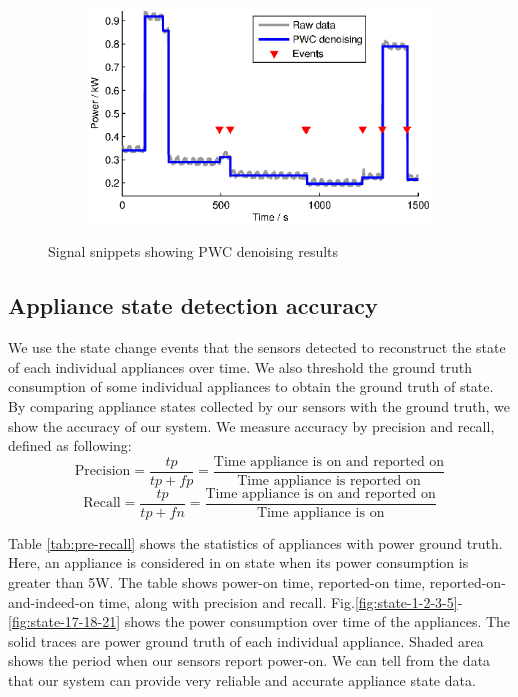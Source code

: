 \begin{figure}[htbp]
\begin{subfigure}[t]{0.47\textwidth}
        \caption{}
    \end{subfigure} 
    \begin{subfigure}[t]{0.47\textwidth}
        \centering
        \includegraphics[width=\textwidth] {../../sw/pc/matlab/pwc-result/4.eps}
        \caption{}
    \end{subfigure} 
    \caption{Signal snippets showing PWC denoising results}\label{fig:pwc-example}
\end{figure}

\subsection{Appliance state detection accuracy}

We use the state change events that the sensors detected to reconstruct the state of each individual appliances over time. We also threshold the ground truth consumption of some individual appliances to obtain the ground truth of state. By comparing appliance states collected by our sensors with the ground truth, we show the accuracy of our system. We measure accuracy by precision and recall, defined as following:
\[
\text{Precision} = \frac{tp}{tp+fp} = 
\frac{\text{Time appliance is on and reported on}}
{\text{Time appliance is reported on}}
\]
\[
\text{Recall} = \frac{tp}{tp+fn} = 
\frac{\text{Time appliance is on and reported on}}
{\text{Time appliance is on}}
\]

Table \ref{tab:pre-recall} shows the statistics of appliances with power ground truth. Here, an appliance is considered in on state when its power consumption is greater than 5W. The table shows power-on time, reported-on time, reported-on-and-indeed-on time, along with precision and recall. Fig.\ref{fig:state-1-2-3-5}-\ref{fig:state-17-18-21} shows the power consumption over time of the appliances. The solid traces are power ground truth of each individual appliance. Shaded area shows the period when our sensors report power-on. We can tell from the data that our system can provide very reliable and accurate appliance state data.

